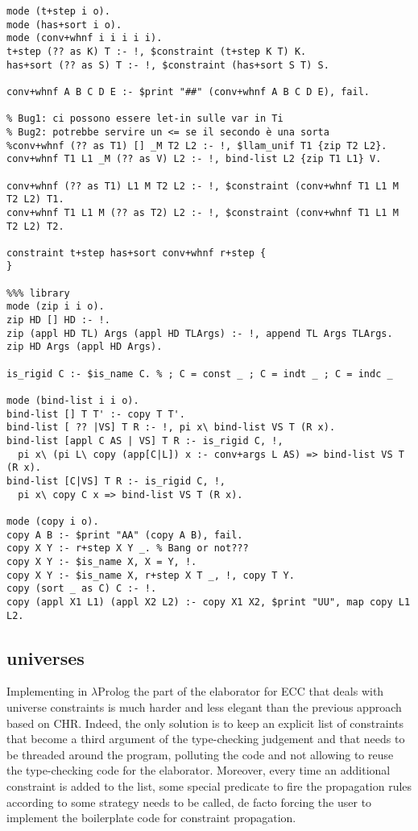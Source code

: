 \documentclass{easychair}
\begin{document}
\begin{verbatim}
mode (t+step i o).
mode (has+sort i o).
mode (conv+whnf i i i i i).
t+step (?? as K) T :- !, $constraint (t+step K T) K.
has+sort (?? as S) T :- !, $constraint (has+sort S T) S.

conv+whnf A B C D E :- $print "##" (conv+whnf A B C D E), fail.

% Bug1: ci possono essere let-in sulle var in Ti
% Bug2: potrebbe servire un <= se il secondo è una sorta
%conv+whnf (?? as T1) [] _M T2 L2 :- !, $llam_unif T1 {zip T2 L2}.
conv+whnf T1 L1 _M (?? as V) L2 :- !, bind-list L2 {zip T1 L1} V.

conv+whnf (?? as T1) L1 M T2 L2 :- !, $constraint (conv+whnf T1 L1 M T2 L2) T1.
conv+whnf T1 L1 M (?? as T2) L2 :- !, $constraint (conv+whnf T1 L1 M T2 L2) T2.

constraint t+step has+sort conv+whnf r+step {
}

%%% library
mode (zip i i o).
zip HD [] HD :- !.
zip (appl HD TL) Args (appl HD TLArgs) :- !, append TL Args TLArgs.
zip HD Args (appl HD Args).

is_rigid C :- $is_name C. % ; C = const _ ; C = indt _ ; C = indc _

mode (bind-list i i o).
bind-list [] T T' :- copy T T'.
bind-list [ ?? |VS] T R :- !, pi x\ bind-list VS T (R x).
bind-list [appl C AS | VS] T R :- is_rigid C, !,
  pi x\ (pi L\ copy (app[C|L]) x :- conv+args L AS) => bind-list VS T (R x).
bind-list [C|VS] T R :- is_rigid C, !,
  pi x\ copy C x => bind-list VS T (R x).

mode (copy i o).
copy A B :- $print "AA" (copy A B), fail.
copy X Y :- r+step X Y _. % Bang or not???
copy X Y :- $is_name X, X = Y, !.
copy X Y :- $is_name X, r+step X T _, !, copy T Y.
copy (sort _ as C) C :- !.
copy (appl X1 L1) (appl X2 L2) :- copy X1 X2, $print "UU", map copy L1 L2.
\end{verbatim}

\subsection{universes}

Implementing in $\lambda$Prolog the part of the elaborator for ECC that deals
with universe constraints is much harder and less elegant than the previous
approach based on CHR. Indeed, the only solution is to keep an explicit list
of constraints that become a third argument of the type-checking judgement and
that needs to be threaded around the program, polluting the code and not
allowing to reuse the type-checking code for the elaborator. Moreover, every
time an additional constraint is added to the list, some special predicate to
fire the propagation rules according to some strategy needs to be called, de
facto forcing the user to implement the boilerplate code for constraint
propagation.
\end{document}
